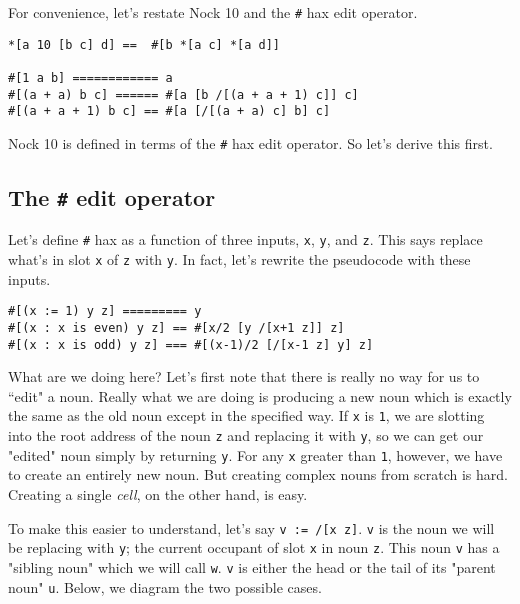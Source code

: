 \documentclass[twoside]{article}
\begin{document}
For convenience, let's restate Nock 10 and the \lstinline[style=inlinecode]{#} hax edit operator.

\begin{lstlisting}[style=listingcode]
*[a 10 [b c] d] ==  #[b *[a c] *[a d]]

#[1 a b] ============ a
#[(a + a) b c] ====== #[a [b /[(a + a + 1) c]] c]
#[(a + a + 1) b c] == #[a [/[(a + a) c] b] c]
\end{lstlisting}

\noindent
Nock 10 is defined in terms of the \lstinline[style=inlinecode]{#} hax edit operator. So let's derive this first.

\subsection{The \texttt{\#} edit operator}

Let's define \lstinline[style=inlinecode]{#} hax as a function of three inputs, \lstinline[style=inlinecode]{x}, \lstinline[style=inlinecode]{y}, and \lstinline[style=inlinecode]{z}. This says replace what's in slot \lstinline[style=inlinecode]{x} of \lstinline[style=inlinecode]{z} with \lstinline[style=inlinecode]{y}. In fact, let's rewrite the pseudocode with these inputs.

\begin{lstlisting}[style=listingblock]
#[(x := 1) y z] ========= y
#[(x : x is even) y z] == #[x/2 [y /[x+1 z]] z]
#[(x : x is odd) y z] === #[(x-1)/2 [/[x-1 z] y] z]
\end{lstlisting}

What are we doing here? Let's first note that there is really no way for us to ``edit" a noun. Really what we are doing is producing a new noun which is exactly the same as the old noun except in the specified way. If \lstinline[style=inlinecode]{x} is \lstinline[style=inlinecode]{1}, we are slotting into the root address of the noun \lstinline[style=inlinecode]{z} and replacing it with \lstinline[style=inlinecode]{y}, so we can get our "edited" noun simply by returning \lstinline[style=inlinecode]{y}. For any \lstinline[style=inlinecode]{x} greater than \lstinline[style=inlinecode]{1}, however, we have to create an entirely new noun. But creating complex nouns from scratch is hard. Creating a single \emph{cell}, on the other hand, is easy.

To make this easier to understand, let's say \lstinline[style=inlinecode]{v := /[x z]}. \lstinline[style=inlinecode]{v} is the noun we will be replacing with \lstinline[style=inlinecode]{y}; the current occupant of slot \lstinline[style=inlinecode]{x} in noun \lstinline[style=inlinecode]{z}.  This noun \lstinline[style=inlinecode]{v} has a "sibling noun" which we will call \lstinline[style=inlinecode]{w}. \lstinline[style=inlinecode]{v} is either the head or the tail of its "parent noun" \lstinline[style=inlinecode]{u}. Below, we diagram the two possible cases.
\newpage
\end{document}
